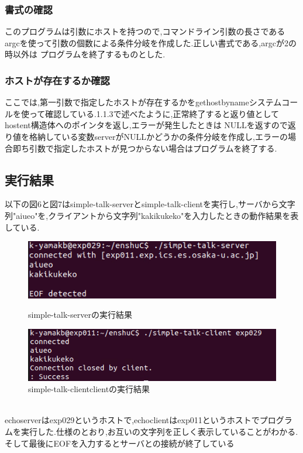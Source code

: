 \documentclass[dvipdfmx]{jarticle}
\begin{document}
\subsubsection{書式の確認}
このプログラムは引数にホストを持つので,コマンドライン引数の長さであるargcを使って引数の個数による条件分岐を作成した.正しい書式である,argcが2の時以外は
プログラムを終了するものとした.
\subsubsection{ホストが存在するか確認}
ここでは,第一引数で指定したホストが存在するかをgethostbynameシステムコールを使って確認している.1.1.3で述べたように,正常終了すると返り値としてhostent構造体へのポインタを返し,エラーが発生したときは
NULLを返すので返り値を格納している変数serverがNULLかどうかの条件分岐を作成し,エラーの場合即ち引数で指定したホストが見つからない場合はプログラムを終了する.
\subsection{実行結果}
以下の図6と図7はsimple-talk-serverとsimple-talk-clientを実行し,サーバから文字列"aiueo"を,クライアントから文字列"kakikukeko"を入力したときの動作結果を表している.
\begin{figure}[htbp]
    \begin{minipage}[b]{0.45\linewidth}
      \centering
      \includegraphics[keepaspectratio, scale=0.5]{2-2server.png}
      \caption{simple-talk-serverの実行結果}
    \end{minipage}
    \begin{minipage}[b]{0.45\linewidth}
      \centering
      \includegraphics[keepaspectratio, scale=0.5]{2-2client.png}
      \caption{simple-talk-clientclientの実行結果}
    \end{minipage}
\end{figure}
\\echoserverはexp029というホストで,echoclientはexp011というホストでプログラムを実行した.仕様のとおり,お互いの文字列を正しく表示していることがわかる.
そして最後にEOFを入力するとサーバとの接続が終了している
\end{document}
